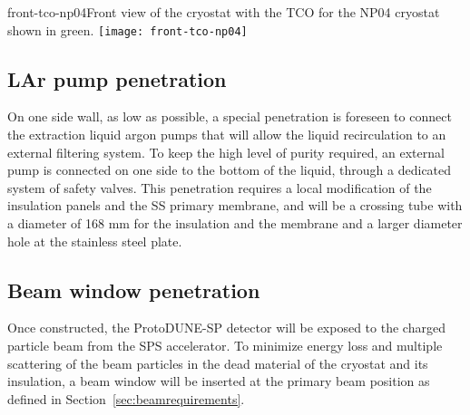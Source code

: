\begin{cdrfigure}{front-tco-np04}{Front view of the cryostat with the TCO for the NP04 cryostat shown in green.}
  \texttt{[image: front-tco-np04]}
\end{cdrfigure}


\subsection{LAr pump penetration}

On one side wall, as low as possible, a special penetration is foreseen to connect the extraction liquid argon pumps that will allow the liquid recirculation to an external filtering system. 
To keep the high level of purity required, an external pump is connected on one side to the bottom of the liquid, through a dedicated system of safety valves. This penetration requires a local modification of the insulation panels and the SS primary membrane, and will be a crossing tube with a diameter of 168 mm for the insulation and the membrane and a larger diameter hole at the stainless steel plate.

\subsection{Beam window penetration}
\label{subsec:beamwindow}
Once constructed, the ProtoDUNE-SP detector will be exposed to the charged
particle beam from the SPS accelerator. To minimize energy loss and
multiple scattering of the beam particles in the dead material of the
cryostat and its insulation, a beam window will be inserted at the primary beam position as defined  in Section~\ref{sec:beamrequirements}. 


